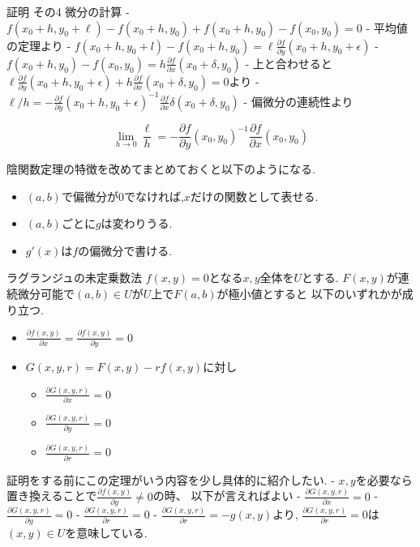 \documentclass{ujarticle}
\begin{document}
証明 その4 微分の計算
- $f(x_0 + h, y_0 + \ell) - f(x_0 + h, y_0) + f(x_0+ h, y_0) - f(x_0, y_0) = 0$
- 平均値の定理より
  - $f(x_0 + h, y_0 + l) - f(x_0 + h, y_0) = \ell \frac{\partial f}{\partial y}(x_0 + h, y_0 + \epsilon)$
  - $f(x_0+ h, y_0) - f(x_0, y_0) = h \frac{\partial f}{\partial x} (x_0 + \delta ,y_0)$
- 上と合わせると$\ell \frac{\partial f}{\partial y}(x_0 + h, y_0 + \epsilon) + h \frac{\partial f}{\partial x }(x_0 + \delta ,y_0) = 0$より
- $\ell / h = - \frac{\partial f}{\partial y}(x_0 + h, y_0 + \epsilon)^{-1} \frac{\partial f}{\partial x}\delta (x_0 + \delta ,y_0)$
- 偏微分の連続性より

  $$\lim_{h \to 0} \frac{\ell}{h} = - \frac{\partial f}{\partial y}(x_0, y_0)^{-1} \frac{\partial f}{\partial x} (x_0, y_0)$$


\begin{rem}
陰関数定理の特徴を改めてまとめておくと以下のようになる.
\begin{itemize}
\item $(a, b)$で偏微分が0でなければ,$x$だけの関数として表せる.
\item $(a, b)$ごとに$g$は変わりうる.
\item $g'(x)$は$f$の偏微分で書ける.
\end{itemize}
\end{rem}

\begin{thm}
ラグランジュの未定乗数法
$f(x ,y) = 0$となる$x, y$全体を$U$とする.
$F(x, y)$が連続微分可能で$(a, b) \in U$が$U$上で$F(a, b)$が極小値とすると
  以下のいずれかが成り立つ.
 \begin{itemize}
  \item $\frac{\partial f(x, y)}{\partial x} = \frac{\partial f(x, y)}{\partial y} = 0$
  \item $G(x, y, r) = F(x, y) - r f(x, y)$に対し
  \begin{itemize}
    \item $\frac{\partial G(x, y, r)}{\partial x} = 0$
    \item $\frac{\partial G(x, y, r)}{\partial y} = 0$
    \item $\frac{\partial G(x, y, r)}{\partial r} = 0$
  \end{itemize}
 \end{itemize}
\end{thm}
証明をする前にこの定理がいう内容を少し具体的に紹介したい.
- $x, y$を必要なら置き換えることで$\frac{\partial f(x, y)}{\partial y} \neq 0$の時、
  以下が言えればよい
  - $\frac{\partial G(x, y, r)}{\partial x} = 0$
  - $\frac{\partial G(x, y, r)}{\partial y} = 0$
  - $\frac{\partial G(x, y, r)}{\partial r} = 0$
- $\frac{\partial G(x, y, r)}{\partial r} = - g(x, y)$より,
  $\frac{\partial G(x, y, r)}{\partial r} = 0$は$(x ,y) \in U$を意味している.
\end{document}
